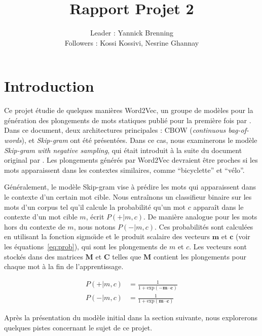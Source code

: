 \documentclass[12pt]{article}
\title{Rapport Projet 2}
\author{Leader : Yannick Brenning \\ Followers : Kossi Kossivi, Nesrine Ghannay}
\begin{document}
\maketitle

\vspace{0.2in}

\section{Introduction} \label{introduction}

Ce projet étudie de quelques manières Word2Vec, un groupe de modèles pour la génération des plongements de mots statiques publié pour la première fois par \cite{DBLP:journals/corr/abs-1301-3781}. Dans ce document, deux architectures principales : CBOW (\textit{continuous bag-of-words}), et \textit{Skip-gram} ont été présentées. Dans ce cas, nous examinerons le modèle \textit{Skip-gram with negative sampling}, qui était introduit à la suite du document original par \cite{DBLP:conf/nips/MikolovSCCD13}. Les plongements générés par Word2Vec devraient être proches si les mots apparaissent dans les contextes similaires, comme ``bicyclette'' et ``vélo''.

Généralement, le modèle Skip-gram vise à prédire les mots qui apparaissent dans le contexte d'un certain mot cible. Nous entraînons un classifieur binaire sur les mots d'un corpus tel qu'il calcule la probabilité qu'un mot $c$ apparaît dans le contexte d'un mot cible $m$, écrit $P(+|m, c)$. De manière analogue pour les mots hors du contexte de $m$, nous notons $P(-|m, c)$. Ces probabilités sont calculées en utilisant la fonction sigmo\"\i de et le produit scalaire des vecteurs $\mathbf{m} $ et $ \mathbf{c} $ (voir les équations~\ref{eq:prob}), qui sont les plongements de $m$ et $c$. Les vecteurs sont stockés dans des matrices $\mathbf{M}$ et $\mathbf{C}$ telles que $\mathbf{M}$ contient les plongements pour chaque mot à la fin de l'apprentissage.

\begin{equation}\label{eq:prob}
\begin{split}
    P(+|m, c) & = \frac{1}{1 + \text{exp}(-\mathbf{m} \cdot \mathbf{c})} \\
    P(-|m, c) & = \frac{1}{1 + \text{exp}(\mathbf{m} \cdot \mathbf{c})} 
\end{split}
\end{equation}

Après la présentation du modèle initial dans la section suivante, nous explorerons quelques pistes concernant le sujet de ce projet.
\end{document}
